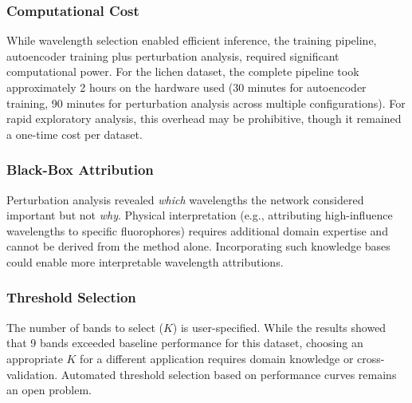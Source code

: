 
\subsubsection{Computational Cost}
While wavelength selection enabled efficient inference, the training pipeline, autoencoder training plus perturbation analysis, required significant computational power.
For the lichen dataset, the complete pipeline took approximately 2 hours on the hardware used (30 minutes for autoencoder training, 90 minutes for perturbation analysis across multiple configurations).
For rapid exploratory analysis, this overhead may be prohibitive, though it remained a one-time cost per dataset.

\subsubsection{Black-Box Attribution}
Perturbation analysis revealed \emph{which} wavelengths the network considered important but not \emph{why}.
Physical interpretation (e.g., attributing high-influence wavelengths to specific fluorophores) requires additional domain expertise \cite{meysurova2021optical,chilingaryan2025spie} and cannot be derived from the method alone.
Incorporating such knowledge bases could enable more interpretable wavelength attributions.

\subsubsection{Threshold Selection}
The number of bands to select ($K$) is user-specified.
While the results showed that 9 bands exceeded baseline performance for this dataset, choosing an appropriate $K$ for a different application requires domain knowledge or cross-validation.
Automated threshold selection based on performance curves remains an open problem.

